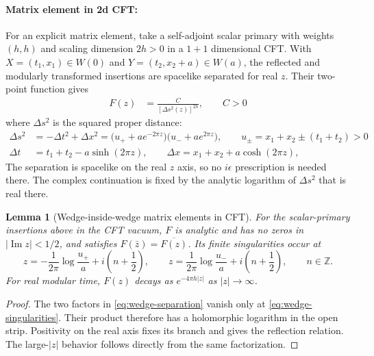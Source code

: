 \documentclass[a4paper,11pt]{article}
\newtheorem{lemma}[theorem]{Lemma}
\theoremstyle{definition}
\newcommand{\nn}{\nonumber}
\begin{document}
\paragraph{Matrix element in 2d CFT:}

For an explicit matrix element, take a self-adjoint scalar primary with weights $(h,h)$ and scaling dimension $2h>0$ in a $1+1$ dimensional CFT. With $X=(t_1,x_1)\in W(0)$ and $Y=(t_2,x_2+a)\in W(a)$, the reflected and modularly transformed insertions are spacelike separated for real $z$. Their two-point function gives
\begin{align}
 F(z)&=\frac{C}{[\Delta s^2(z)]^{2h}},\qquad C>0
\label{eq:wedge-matrix-element}
\end{align}
where $\Delta s^2$ is the squared proper distance:
\begin{align}
\Delta s^2&=-\Delta t^2+\Delta x^2
 =\bigl(u_++ae^{-2\pi z}\bigr)\bigl(u_-+ae^{2\pi z}\bigr),
 \qquad u_\pm=x_1+x_2\pm(t_1+t_2)>0\nn\\
 \Delta t&=t_1+t_2-a\sinh(2\pi z),\qquad
 \Delta x=x_1+x_2+a\cosh(2\pi z),
 \label{eq:wedge-separation}
\end{align}
The separation is spacelike on the real $z$ axis, so no $i\epsilon$ prescription is needed there. The complex continuation is fixed by the analytic logarithm of $\Delta s^2$ that is real there.

\begin{lemma}[Wedge-inside-wedge matrix elements in CFT]
\label{lem:wedge-matrix-element}
For the scalar-primary insertions above in the CFT vacuum, $F$ is analytic and has no zeros in $|\operatorname{Im}z|<1/2$, and satisfies $F(\bar z)=\overline{F(z)}$. Its finite singularities occur at
\begin{equation}
 z=-\frac{1}{2\pi}\log\frac{u_+}{a}+i\left(n+\frac12\right),
 \qquad
 z=\frac{1}{2\pi}\log\frac{u_-}{a}+i\left(n+\frac12\right),
 \qquad n\in\mathbb Z.
 \label{eq:wedge-singularities}
\end{equation}
For real modular time, $F(z)$ decays as $e^{-4\pi h|z|}$ as $|z|\to\infty$.
\end{lemma}
\begin{proof}
The two factors in \eqref{eq:wedge-separation} vanish only at \eqref{eq:wedge-singularities}. Their product therefore has a holomorphic logarithm in the open strip. Positivity on the real axis fixes its branch and gives the reflection relation. The large-$|z|$ behavior follows directly from the same factorization.
\end{proof}
\end{document}
